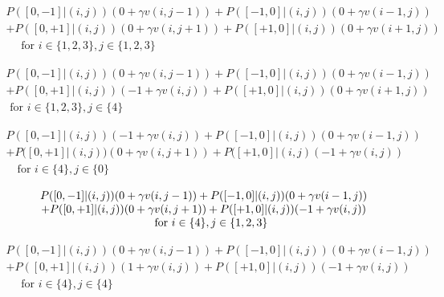 \documentclass[11pt]{article}
\begin{document}
\begin{equation}
\begin{array}{c}
{P([0,-1] |(i, j))(0+\gamma v(i, j-1))+P([-1,0] |(i, j))(0+\gamma v(i-1, j))} \\
{+P([0,+1]|(i, j))( 0+\gamma v(i, j+1))+P([+1,0] |(i, j))(0+\gamma v(i+1, j))} \\
{\quad \text { for } i \in\{1,2,3\}, j \in\{1,2,3\}}
\end{array}
\end{equation}

\begin{equation}
\begin{array}{c}
{P([0,-1]|(i, j))(0+\gamma v(i, j-1))+P([-1,0] |(i, j))(0+\gamma v(i-1, j))} \\
{+P([0,+1]|(i, j))(-1+\gamma v(i, j))+P([+1,0] |(i, j))(0+\gamma v(i+1, j))} \\
{ \text { for } i \in\{1,2,3\}, j \in\{4\}}
\end{array}
\end{equation}

\begin{equation}
\begin{array}{c}
{P([0,-1]|(i, j))(-1+\gamma v(i, j))+P([-1,0]|(i, j))(0+\gamma v(i-1, j))} \\
{+P([0,+1]|(i, j))(0+\gamma v(i, j+1))+P([+1,0]|(i, j)(-1+\gamma v(i, j))} \\
{\quad \text{for } i \in\{4\}, j \in\{0\}}
\end{array}
\end{equation}

\begin{equation}
\begin{array}{c}
{P([0,-1] |(i,j))(0+\gamma v(i, j-1))+P([-1,0] |(i, j))(0+\gamma v(i-1, j))} \\
{+P([0,+1] |(i, j))(0+\gamma v(i, j+1))+P([+1,0] |(i, j))(-1+\gamma v(i, j))}\\
{\quad \text { for } i \in\{4\}, j \in\{1,2,3\}}
\end{array}\\
\end{equation}


\begin{equation}
\begin{array}{c}
{P([0,-1] |(i, j))(0+\gamma v(i, j-1))+P([-1,0]|(i, j))(0+\gamma v(i-1, j))} \\
{+P([0,+1]|(i, j))(1+\gamma v(i, j))+P([+1,0]|(i,j))(-1+\gamma v(i, j))} \\
{\quad \text { for } i \in\{4\}, j \in\{4\}}
\end{array}
\end{equation}
\end{document}
